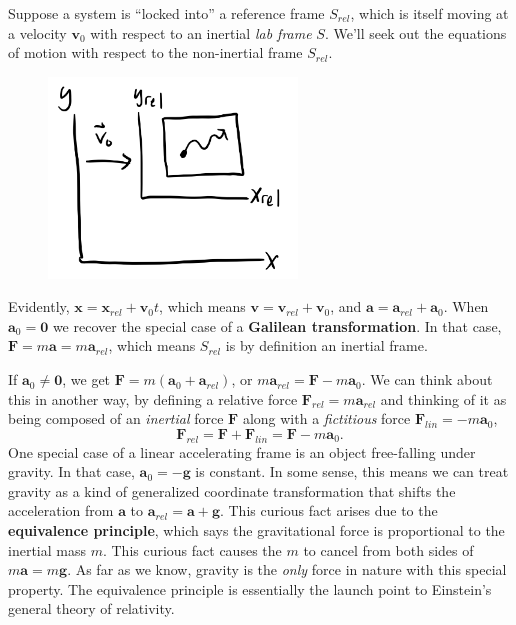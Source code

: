 \documentclass[
  letterpaper,
  DIV=11,
  numbers=noendperiod]{scrreprt}
\begin{document}
Suppose a system is ``locked into'' a reference frame \(S_{rel}\), which
is itself moving at a velocity \(\mathbf{v}_0\) with respect to an
inertial \emph{lab frame} \(S\). We'll seek out the equations of motion
with respect to the non-inertial frame \(S_{rel}\).

\begin{figure}

{\centering \includegraphics[width=2.60417in,height=\textheight]{classical-mechanics/./resources/image-20230216114604959.png}

}

\end{figure}

Evidently, \(\mathbf{x} = \mathbf{x}_{rel} + \mathbf{v}_0t\), which
means \(\mathbf{v} = \mathbf{v}_{rel} + \mathbf{v}_0\), and
\(\mathbf{a} = \mathbf{a}_{rel} + \mathbf{a}_0\). When
\(\mathbf{a}_0=\mathbf{0}\) we recover the special case of a
\textbf{Galilean transformation}. In that case,
\(\mathbf{F} = m \mathbf{a} = m \mathbf{a}_{rel}\), which means
\(S_{rel}\) is by definition an inertial frame.

If \(\mathbf{a}_0 \neq \mathbf{0}\), we get
\(\mathbf{F} = m(\mathbf{a}_0 + \mathbf{a}_{rel})\), or
\(m\mathbf{a}_{rel} = \mathbf{F} - m \mathbf{a}_0\). We can think about
this in another way, by defining a relative force
\(\mathbf{F}_{rel} = m\mathbf{a}_{rel}\) and thinking of it as being
composed of an \emph{inertial} force \(\mathbf{F}\) along with a
\emph{fictitious} force \(\mathbf{F}_{lin} = -m\mathbf{a}_0\), \[
\mathbf{F}_{rel} = \mathbf{F} + \mathbf{F}_{lin} = \mathbf{F} - m \mathbf{a}_0.
\] One special case of a linear accelerating frame is an object
free-falling under gravity. In that case, \(\mathbf{a}_0=-\mathbf{g}\)
is constant. In some sense, this means we can treat gravity as a kind of
generalized coordinate transformation that shifts the acceleration from
\(\mathbf{a}\) to \(\mathbf{a}_{rel} = \mathbf{a} + \mathbf{g}\). This
curious fact arises due to the \textbf{equivalence principle}, which
says the gravitational force is proportional to the inertial mass \(m\).
This curious fact causes the \(m\) to cancel from both sides of
\(m\mathbf{a} = m\mathbf{g}\). As far as we know, gravity is the
\emph{only} force in nature with this special property. The equivalence
principle is essentially the launch point to Einstein's general theory
of relativity.
\end{document}
